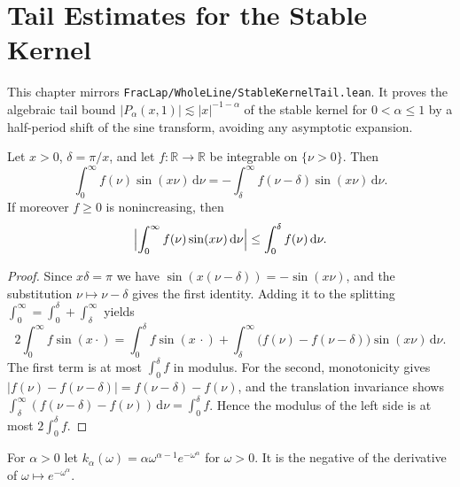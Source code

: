 \chapter{Tail Estimates for the Stable Kernel}

This chapter mirrors \texttt{FracLap/WholeLine/StableKernelTail.lean}. It proves the algebraic tail bound $\lvert P_\alpha(x, 1) \rvert \lesssim \lvert x \rvert^{-1-\alpha}$ of the stable kernel for $0 < \alpha \le 1$ by a half-period shift of the sine transform, avoiding any asymptotic expansion.

\begin{lemma}\label{lem:half_period_shift}
\leanok
Let $x > 0$, $\delta = \pi / x$, and let $f : \mathbb{R} \to \mathbb{R}$ be integrable on $\{\nu > 0\}$. Then
\[
  \int_0^\infty f(\nu) \sin(x\nu)\, \mathrm{d}\nu = -\int_\delta^\infty f(\nu - \delta) \sin(x\nu)\, \mathrm{d}\nu.
\]
If moreover $f \ge 0$ is nonincreasing, then
\[
  \Bigl\lvert \int_0^\infty f(\nu) \sin(x\nu)\, \mathrm{d}\nu \Bigr\rvert \le \int_0^\delta f(\nu)\, \mathrm{d}\nu.
\]
\end{lemma}

\begin{proof}
\leanok
Since $x \delta = \pi$ we have $\sin(x(\nu - \delta)) = -\sin(x\nu)$, and the substitution $\nu \mapsto \nu - \delta$ gives the first identity. Adding it to the splitting $\int_0^\infty = \int_0^\delta + \int_\delta^\infty$ yields
\[
  2 \int_0^\infty f \sin(x \cdot) = \int_0^\delta f \sin(x\,\cdot) + \int_\delta^\infty \bigl(f(\nu) - f(\nu - \delta)\bigr) \sin(x\nu)\, \mathrm{d}\nu.
\]
The first term is at most $\int_0^\delta f$ in modulus. For the second, monotonicity gives $\lvert f(\nu) - f(\nu - \delta) \rvert = f(\nu - \delta) - f(\nu)$, and the translation invariance shows $\int_\delta^\infty (f(\nu - \delta) - f(\nu))\, \mathrm{d}\nu = \int_0^\delta f$. Hence the modulus of the left side is at most $2 \int_0^\delta f$.
\end{proof}

\begin{definition}\label{def:stable_density}
\leanok
For $\alpha > 0$ let $k_\alpha(\omega) = \alpha \omega^{\alpha - 1} e^{-\omega^\alpha}$ for $\omega > 0$. It is the negative of the derivative of $\omega \mapsto e^{-\omega^\alpha}$.
\end{definition}

